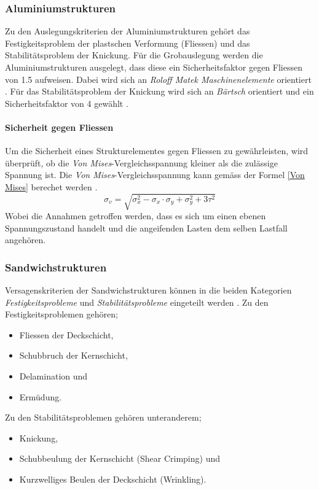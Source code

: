   \subsubsection{Aluminiumstrukturen}
  Zu den Auslegungskriterien der Aluminiumstrukturen gehört das Festigkeitsproblem der plastschen Verformung (Fliessen) und das Stabilitätsproblem der Knickung. Für die Grobauslegung werden die Aluminiumstrukturen ausgelegt, dass diese ein Sicherheitsfaktor gegen Fliessen von 1.5 aufweisen. Dabei wird sich an \emph{Roloff Matek Maschinenelemente} orientiert \cite{Roloff}. Für das Stabilitätsproblem der Knickung wird sich an \emph{Bärtsch} orientiert und ein Sicherheitsfaktor von 4 gewählt \cite{Baertsch}.

  \paragraph{Sicherheit gegen Fliessen}
  Um die Sicherheit eines Strukturelementes gegen Fliessen zu gewährleisten, wird überprüft, ob die \emph{Von Mises}-Vergleichsspannung kleiner als die zulässige Spannung ist. Die \emph{Von Mises}-Vergleichsspannung kann gemäss der Formel \ref{Von Mises} berechet werden \cite{Baertsch}.
  \begin{equation}
    \label{Von Mises}
    \sigma_v = \sqrt{\sigma_x^{2}-\sigma_x \cdot \sigma_y + \sigma_y^2 + 3\tau^2}
  \end{equation}
  Wobei die Annahmen getroffen werden, dass es sich um einen ebenen Spannungszustand handelt und die angeifenden Lasten dem selben Lastfall angehören.

  \subsubsection{Sandwichstrukturen}
  Versagenskriterien der Sandwichstrukturen können in die beiden Kategorien \emph{Festigkeitsprobleme} und \emph{Stabilitätsprobleme} eingeteilt werden \cite{ETH}. Zu den Festigkeitsproblemen gehören;
  \begin{itemize}
    \item Fliessen der Deckschicht,
    \item Schubbruch der Kernschicht,
    \item Delamination und
    \item Ermüdung.
  \end{itemize}

  Zu den Stabilitätsproblemen gehören unteranderem;
  \begin{itemize}
    \item Knickung,
    \item Schubbeulung der Kernschicht (Shear Crimping) und
    \item Kurzwelliges Beulen der Deckschicht (Wrinkling).
  \end{itemize}

